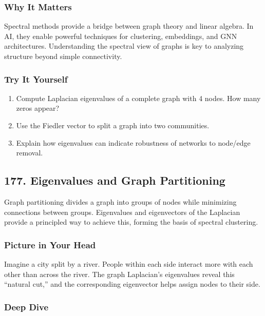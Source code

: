 \documentclass[
  letterpaper,
  DIV=11,
  numbers=noendperiod]{scrreprt}
\providecommand{\tightlist}{%
  \setlength{\itemsep}{0pt}\setlength{\parskip}{0pt}}
\begin{document}
\subsubsection{Why It Matters}\label{why-it-matters-73}

Spectral methods provide a bridge between graph theory and linear
algebra. In AI, they enable powerful techniques for clustering,
embeddings, and GNN architectures. Understanding the spectral view of
graphs is key to analyzing structure beyond simple connectivity.

\subsubsection{Try It Yourself}\label{try-it-yourself-175}

\begin{enumerate}
\def\labelenumi{\arabic{enumi}.}
\tightlist
\item
  Compute Laplacian eigenvalues of a complete graph with 4 nodes. How
  many zeros appear?
\item
  Use the Fiedler vector to split a graph into two communities.
\item
  Explain how eigenvalues can indicate robustness of networks to
  node/edge removal.
\end{enumerate}

\subsection{177. Eigenvalues and Graph
Partitioning}\label{eigenvalues-and-graph-partitioning}

Graph partitioning divides a graph into groups of nodes while minimizing
connections between groups. Eigenvalues and eigenvectors of the
Laplacian provide a principled way to achieve this, forming the basis of
spectral clustering.

\subsubsection{Picture in Your Head}\label{picture-in-your-head-176}

Imagine a city split by a river. People within each side interact more
with each other than across the river. The graph Laplacian's eigenvalues
reveal this ``natural cut,'' and the corresponding eigenvector helps
assign nodes to their side.

\subsubsection{Deep Dive}\label{deep-dive-176}
\end{document}
